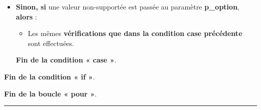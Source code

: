 \documentclass[a4paper,10pt]{article}
\begin{document}
\begin{itemize}
{\begin{itemize}
{\begin{itemize}
{                        \begin{justify}
                            \textbf{\color{cond}Fin de la condition « if »}.
                        \end{justify}
                    }
                \end{itemize}
            }

            \item
            {
                \setlength{\parskip}{2em}

                \begin{justify}
                    \textbf{\color{case}Sinon, si} une valeur non-supportée est passée au paramètre \textbf{\color{vars}p\_option}, \textbf{\color{case}alors} :
                \end{justify}

                \setlength{\parskip}{1em}

                \begin{itemize}
                    \item
                    {
                        \begin{justify}
                            Les mêmes \textbf{\color{cond}vérifications que \color{case}dans la condition case précédente} sont effectuées.
                        \end{justify}
                    }
                \end{itemize}

                \begin{justify}
                    \textbf{\color{case}Fin de la condition « case »}.
                \end{justify}
            }
        \end{itemize}

        \begin{justify}
            \textbf{\color{cond}Fin de la condition « if »}.
        \end{justify}
    }
\end{itemize}

\begin{justify}
    \textbf{\color{loop}Fin de la boucle « pour »}.
\end{justify}

\setlength{\parskip}{1em}


\par\noindent\rule{\textwidth}{0.4pt}
\end{document}
